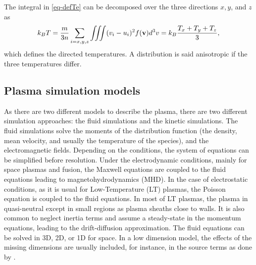 The integral in \cref{eq-defTe} can be decomposed over the three directions $x,y$, and $z$ as
\begin{equation} \label{eq-3Te}
  k_B T = \frac{m}{3 n} \sum_{i=x,y,z} \iiint (v_i - u_i)^2 f({\mathbf v}) d^3v = k_B \frac{ T_x + T_y + T_z}{3},
\end{equation}
which defines the directed temperatures.
A distribution is said anisotropic if the three temperatures differ.

\subsection*{Plasma simulation models} \label{subsec-simulations}
As there are two different models to describe the plasma, there are two different simulation approaches\string: the fluid simulations and the kinetic simulations.
The fluid simulations solve the moments of the distribution function (the density, mean velocity, and usually the temperature of the species), and the electromagnetic fields.
Depending on the conditions, the system of equations can be simplified before resolution.
Under the electrodynamic conditions, mainly for space plasmas and fusion, the Maxwell equations are coupled to the fluid equations leading to magnetohydrodynamics (MHD).
In the case of electrostatic conditions, as it is usual for Low-Temperature (LT) plasmas, the Poisson equation is coupled to the fluid equations.
In most of LT plasmas, the plasma in quasi-neutral except in small regions as plasma sheaths close to walls.
It is also common to neglect inertia terms and assume a steady-state in the momentum equations, leading to the drift-diffusion approximation.
The fluid equations can be solved in \ac{3D}, \ac{2D}, or \ac{1D} for space.
In a low dimension model, the effects of the missing dimensions are usually included, for instance, in the source terms as done by \citet{barral2003a}.


